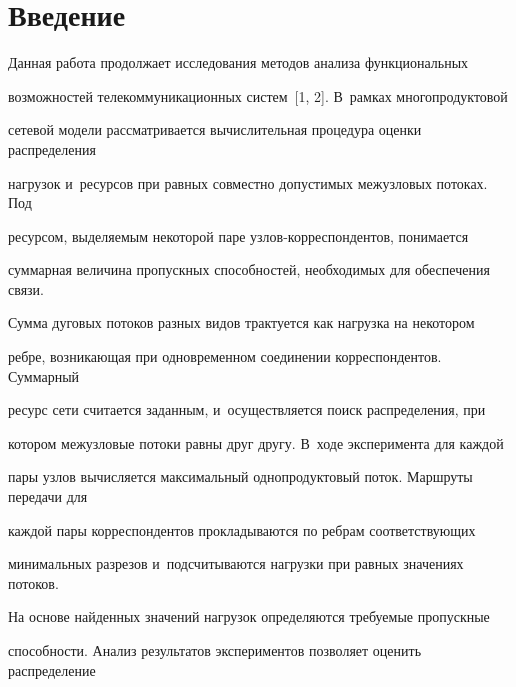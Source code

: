  \thispagestyle{headings}


 


 \vspace*{-16pt}





\section{Введение}





\vspace*{-3pt}





Данная работа продолжает  исследования методов   анализа  функциональных 


возможностей  телекоммуникационных систем~[1, 2].  В~рамках многопродуктовой 


сетевой модели   рассматривается вычислительная процедура оценки  распределения  


нагрузок и~ресурсов при равных совместно допустимых межузловых потоках. Под 


ресурсом,  выделяемым  некоторой паре уз\-лов-кор\-рес\-пон\-ден\-тов, понимается 


суммарная величина пропускных способностей,  необходимых для обеспечения связи.  


Сумма дуговых  потоков  разных видов трактуется как  нагрузка на  некотором 


ребре,  возникающая при одновременном соединении  корреспондентов. Суммарный 


ресурс  сети  считается заданным,  и~осуществляется поиск распределения, при 


котором  межузловые потоки равны друг другу.   В~ходе эксперимента   для каждой 


пары узлов вычисляется максимальный однопродуктовый поток. Маршруты передачи для  


каждой  пары корреспондентов  прокладываются по ребрам соответствующих 


минимальных разрезов и~подсчитываются   нагрузки при  равных значениях потоков.  


На основе найденных значений  нагрузок определяются требуемые пропускные 


способности. Анализ результатов экспериментов  позволяет  оценить  распределение 


